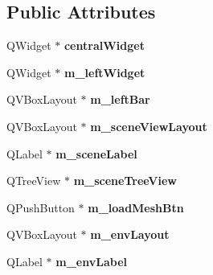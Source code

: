 \subsection*{Public Attributes}
\begin{DoxyCompactItemize}
\item 
\hypertarget{classUi__MainWindow_a30075506c2116c3ed4ff25e07ae75f81}{Q\-Widget $\ast$ {\bfseries central\-Widget}}\label{classUi__MainWindow_a30075506c2116c3ed4ff25e07ae75f81}

\item 
\hypertarget{classUi__MainWindow_a514e971a792abb051013b69a17f0f243}{Q\-Widget $\ast$ {\bfseries m\-\_\-left\-Widget}}\label{classUi__MainWindow_a514e971a792abb051013b69a17f0f243}

\item 
\hypertarget{classUi__MainWindow_a648c7f639f969e69e9b4c4522e209816}{Q\-V\-Box\-Layout $\ast$ {\bfseries m\-\_\-left\-Bar}}\label{classUi__MainWindow_a648c7f639f969e69e9b4c4522e209816}

\item 
\hypertarget{classUi__MainWindow_a64e41af8e7265491439c20298c173280}{Q\-V\-Box\-Layout $\ast$ {\bfseries m\-\_\-scene\-View\-Layout}}\label{classUi__MainWindow_a64e41af8e7265491439c20298c173280}

\item 
\hypertarget{classUi__MainWindow_ad67691cb32591de26ff3bb9234f979ab}{Q\-Label $\ast$ {\bfseries m\-\_\-scene\-Label}}\label{classUi__MainWindow_ad67691cb32591de26ff3bb9234f979ab}

\item 
\hypertarget{classUi__MainWindow_aa75a17fb593180faf058746a3d0f5435}{Q\-Tree\-View $\ast$ {\bfseries m\-\_\-scene\-Tree\-View}}\label{classUi__MainWindow_aa75a17fb593180faf058746a3d0f5435}

\item 
\hypertarget{classUi__MainWindow_ad54952c1d3762f0acf4e7e8e33c36b3d}{Q\-Push\-Button $\ast$ {\bfseries m\-\_\-load\-Mesh\-Btn}}\label{classUi__MainWindow_ad54952c1d3762f0acf4e7e8e33c36b3d}

\item 
\hypertarget{classUi__MainWindow_a711a120cdcd77c5f3030fb2863395364}{Q\-V\-Box\-Layout $\ast$ {\bfseries m\-\_\-env\-Layout}}\label{classUi__MainWindow_a711a120cdcd77c5f3030fb2863395364}

\item 
\hypertarget{classUi__MainWindow_a3f14111eb6b3d622f1dd651ae6e95490}{Q\-Label $\ast$ {\bfseries m\-\_\-env\-Label}}\label{classUi__MainWindow_a3f14111eb6b3d622f1dd651ae6e95490}


\end{DoxyCompactItemize}
